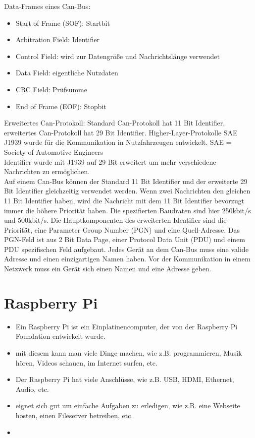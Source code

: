 Data-Frames eines Can-Bus:
\begin{itemize}
    \item Start of Frame (SOF): Startbit
    \item Arbitration Field: Identifier
    \item Control Field: wird zur Datengröße und Nachrichtslänge verwendet
    \item Data Field: eigentliche Nutzdaten
    \item CRC Field: Prüfsumme
    \item End of Frame (EOF): Stopbit
\end{itemize}
\cite[Seite 36]{Voss2008}

Erweitertes Can-Protokoll: 
Standard Can-Protokoll hat 11 Bit Identifier, erweitertes Can-Protokoll hat 29 Bit Identifier.
Higher-Layer-Protokolle SAE J1939 wurde für die Kommunikation in Nutzfahrzeugen entwickelt.
SAE = Society of Automotive Engineers\\
Identifier wurde mit J1939 auf 29 Bit erweitert um mehr verschiedene Nachrichten zu ermöglichen.\\
Auf einem Can-Bus können der Standard 11 Bit Identifier und der erweiterte 29 Bit Identifier gleichzeitig verwendet werden.
Wenn zwei Nachrichten den gleichen 11 Bit Identifier haben, wird die Nachricht mit dem 11 Bit Identifier bevorzugt immer die
höhere Priorität haben. Die spezifierten Baudraten sind hier 250kbit/s und 500kbit/s. Die Hauptkomponenten des
erweiterten Identifier sind die Priorität, eine Parameter Group Number (PGN) und eine Quell-Adresse.
Das PGN-Feld ist aus 2 Bit Data Page, einer Protocol Data Unit (PDU) und einem PDU spezifischen Feld 
aufgebaut.
Jedes Gerät an dem Can-Bus muss eine valide Adresse und einen einzigartigen Namen haben. Vor 
der Kommunikation in einem Netzwerk muss ein Gerät sich einen Namen und eine Adresse geben.
\cite{Murvay2018}



\section{Raspberry Pi}
\begin{itemize}
    \item Ein Raspberry Pi ist ein Einplatinencomputer, der von der Raspberry Pi Foundation entwickelt wurde.
    \item mit diesem kann man viele Dinge machen, wie z.B. programmieren, Musik hören, Videos schauen, im Internet surfen, etc.
    \item Der Raspberry Pi hat viele Anschlüsse, wie z.B. USB, HDMI, Ethernet, Audio, etc.
    \item eignet sich gut um einfache Aufgaben zu erledigen, wie z.B. eine Webseite hosten, einen Fileserver betreiben, etc.
    \item 
\end{itemize}

